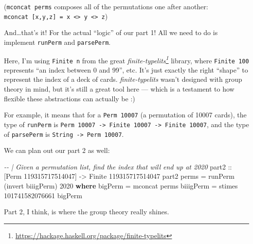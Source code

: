 \documentclass[]{article}
\newenvironment{Shaded}{}{}
\newcommand{\CommentTok}[1]{\textcolor[rgb]{0.38,0.63,0.69}{\textit{#1}}}
\newcommand{\DataTypeTok}[1]{\textcolor[rgb]{0.56,0.13,0.00}{#1}}
\newcommand{\DecValTok}[1]{\textcolor[rgb]{0.25,0.63,0.44}{#1}}
\newcommand{\FunctionTok}[1]{\textcolor[rgb]{0.02,0.16,0.49}{#1}}
\newcommand{\KeywordTok}[1]{\textcolor[rgb]{0.00,0.44,0.13}{\textbf{#1}}}
\newcommand{\NormalTok}[1]{#1}
\newcommand{\OtherTok}[1]{\textcolor[rgb]{0.00,0.44,0.13}{#1}}
\renewcommand{\href}[2]{#2\footnote{\url{#1}}}
\begin{document}
(\texttt{mconcat\ perms} composes all of the permutations one after another:
\texttt{mconcat\ {[}x,y,z{]}\ =\ x\ \textless{}\textgreater{}\ y\ \textless{}\textgreater{}\ z})

And\ldots that's it! For the actual ``logic'' of our part 1! All we need to do
is implement \texttt{runPerm} and \texttt{parsePerm}.

Here, I'm using \texttt{Finite\ n} from the great
\emph{\href{https://hackage.haskell.org/package/finite-typelits}{finite-typelits}}
library, where \texttt{Finite\ 100} represents ``an index between 0 and 99'',
etc. It's just exactly the right ``shape'' to represent the index of a deck of
cards. \emph{finite-typelits} wasn't designed with group theory in mind, but
it's still a great tool here --- which is a testament to how flexible these
abstractions can actually be :)

For example, it means that for a \texttt{Perm\ 10007} (a permutation of 10007
cards), the type of \texttt{runPerm} is
\texttt{Perm\ 10007\ -\textgreater{}\ Finite\ 10007\ -\textgreater{}\ Finite\ 10007},
and the type of \texttt{parsePerm} is
\texttt{String\ -\textgreater{}\ Perm\ 10007}.

We can plan out our part 2 as well:

\begin{Shaded}
\begin{Highlighting}[]
\CommentTok{{-}{-} | Given a permutation list, find the index that will end up at 2020}
\OtherTok{part2 ::}\NormalTok{ [}\DataTypeTok{Perm} \DecValTok{119315717514047}\NormalTok{] }\OtherTok{{-}\textgreater{}} \DataTypeTok{Finite} \DecValTok{119315717514047}
\NormalTok{part2 perms }\OtherTok{=}\NormalTok{ runPerm (invert biiigPerm) }\DecValTok{2020}
  \KeywordTok{where}
\NormalTok{    bigPerm   }\OtherTok{=} \FunctionTok{mconcat}\NormalTok{ perms}
\NormalTok{    biiigPerm }\OtherTok{=}\NormalTok{ stimes }\DecValTok{101741582076661}\NormalTok{ bigPerm}
\end{Highlighting}
\end{Shaded}

Part 2, I think, is where the group theory really shines.
\end{document}
